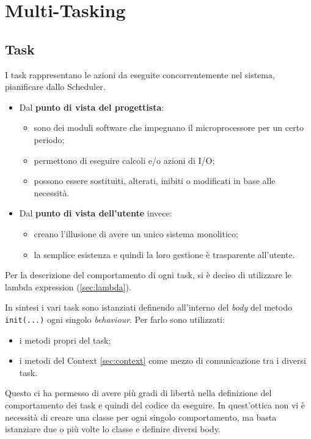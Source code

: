 \chapter{Multi-Tasking}

\section{Task}
I task rappresentano le azioni da eseguite concorrentemente nel sistema, pianificare dallo Scheduler. 

\begin{itemize}
	\item Dal \textbf{punto di vista del progettista}:
	\begin{itemize}
		\item sono dei moduli software che impegnano il microprocessore per un certo periodo;
		\item permettono di eseguire calcoli e/o azioni di I/O;
		\item possono essere sostituiti, alterati, inibiti o modificati in base alle necessità.
	\end{itemize}
	\item Dal \textbf{punto di vista dell'utente} invece:
	\begin{itemize}
		\item  creano l'illusione di avere un unico sistema monolitico;
		\item  la semplice esistenza e quindi la loro gestione è trasparente all'utente.
	\end{itemize}
\end{itemize}

Per la descrizione del comportamento di ogni task, si è deciso di utilizzare le lambda expression (\ref{sec:lambda}). 

In sintesi i vari task sono istanziati definendo all'interno del \textit{body} del metodo \texttt{init(...)} ogni singolo \textit{behaviour}. Per farlo sono utilizzati: 
\begin{itemize}
	\item i metodi propri del task;
	\item i metodi del Context \ref{sec:context} come mezzo di comunicazione tra i diversi task.
\end{itemize}

Questo ci ha permesso di avere più gradi di libertà nella definizione del comportamento dei task e quindi del codice da eseguire. In quest'ottica non vi è necessità di creare una classe per ogni singolo comportamento, ma basta istanziare due o più volte lo classe e definire diversi body.

